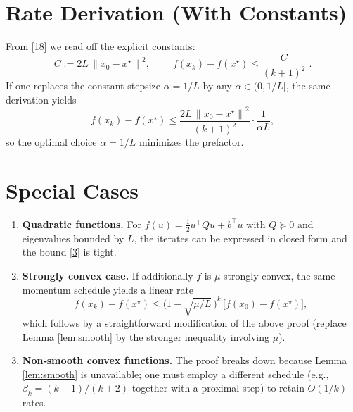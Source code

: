 \documentclass{article}
\newcommand{\norm}[1]{\left\lVert#1\right\rVert}
\begin{document}
\section*{Rate Derivation (With Constants)}
From \eqref{18} we read off the explicit constants:
\[
C:=2L\,\norm{x_0-x^\star}^{2},\qquad
\boxed{\;f(x_k)-f(x^\star)\le \dfrac{C}{(k+1)^2}\; }.
\]
If one replaces the constant stepsize $\alpha=1/L$ by any $\alpha\in(0,1/L]$,
the same derivation yields 
\[
f(x_k)-f(x^\star)\le\frac{2L\,\norm{x_0-x^\star}^{2}}{(k+1)^2}
\cdot\frac{1}{\alpha L},
\]
so the optimal choice $\alpha=1/L$ minimizes the prefactor.

\section*{Special Cases}
\begin{enumerate}[label={\bf SC\arabic*:},leftmargin=*]
\item \textbf{Quadratic functions.} For $f(u)=\frac12 u^\top Q u+b^\top u$ with $Q\succeq0$ and eigenvalues bounded by $L$, the iterates can be expressed in closed form and the bound \eqref{3} is tight.
\item \textbf{Strongly convex case.} If additionally $f$ is $\mu$‑strongly convex, the same momentum schedule yields a linear rate
\[
f(x_k)-f(x^\star)\le \bigl(1-\sqrt{\mu/L}\,\bigr)^{k}\,
\bigl[f(x_0)-f(x^\star)\bigr],
\]
which follows by a straightforward modification of the above proof (replace Lemma \ref{lem:smooth} by the stronger inequality involving $\mu$).
\item \textbf{Non‑smooth convex functions.} The proof breaks down because Lemma \ref{lem:smooth} is unavailable; one must employ a different schedule (e.g., $\beta_k= (k-1)/(k+2)$ together with a proximal step) to retain $O(1/k)$ rates.
\end{enumerate}
\end{document}
